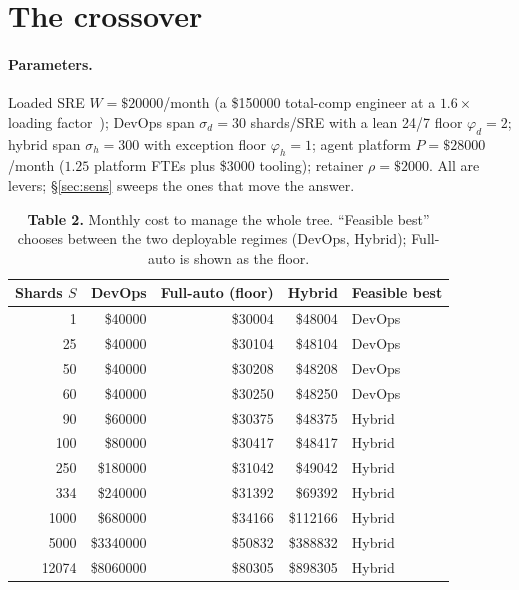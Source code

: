 \documentclass[11pt]{article}
\newcommand{\shards}{S}
\begin{document}
\section{The crossover}
\label{sec:cross}

\paragraph{Parameters.} Loaded SRE $W=\$\num{20000}$/month (a \$\num{150000} total-comp engineer at a
$1.6\times$ loading factor~\cite{builtin2026,kore2026}); DevOps span $\sigma_d=30$ shards/SRE with a
lean 24/7 floor $\varphi_d=2$; hybrid span $\sigma_h=300$ with exception floor $\varphi_h=1$; agent
platform $P=\$\num{28000}$/month ($1.25$ platform FTEs plus \$\num{3000} tooling); retainer
$\rho=\$\num{2000}$. All are levers; \S\ref{sec:sens} sweeps the ones that move the answer.

\begin{table}[h]
\centering
\caption*{\textbf{Table 2.} Monthly cost to manage the whole tree. ``Feasible best'' chooses between
the two deployable regimes (DevOps, Hybrid); Full-auto is shown as the floor.}
\setlength{\tabcolsep}{6pt}
\renewcommand{\arraystretch}{1.12}
\begin{tabular}{@{}rrrrl@{}}
\toprule
Shards $\shards$ & DevOps & Full-auto (floor) & Hybrid & Feasible best \\
\midrule
\num{1}     & \$\num{40000}      & \$\num{30004}  & \$\num{48004}  & DevOps \\
\num{25}    & \$\num{40000}      & \$\num{30104}  & \$\num{48104}  & DevOps \\
\num{50}    & \$\num{40000}      & \$\num{30208}  & \$\num{48208}  & DevOps \\
\num{60}    & \$\num{40000}      & \$\num{30250}  & \$\num{48250}  & DevOps \\
\rowcolor{coolrow}\num{90} & \$\num{60000} & \$\num{30375} & \$\num{48375} & Hybrid \\
\num{100}   & \$\num{80000}      & \$\num{30417}  & \$\num{48417}  & Hybrid \\
\num{250}   & \$\num{180000}     & \$\num{31042}  & \$\num{49042}  & Hybrid \\
\num{334}   & \$\num{240000}     & \$\num{31392}  & \$\num{69392}  & Hybrid \\
\num{1000}  & \$\num{680000}     & \$\num{34166}  & \$\num{112166} & Hybrid \\
\num{5000}  & \$\num{3340000}    & \$\num{50832}  & \$\num{388832} & Hybrid \\
\rowcolor{hotrow}\num{12074} & \$\num{8060000} & \$\num{80305} & \$\num{898305} & Hybrid \\
\bottomrule
\end{tabular}
\end{table}
\end{document}
